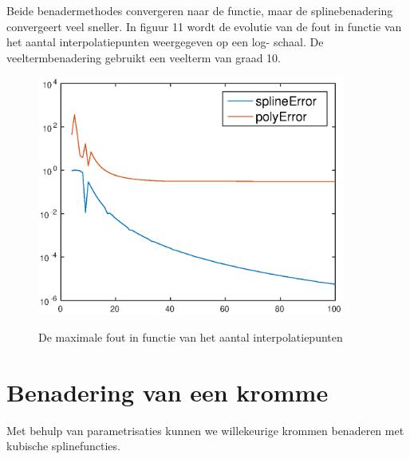 \documentclass[]{article}
\begin{document}
\noindent Beide benadermethodes convergeren naar de functie, maar de splinebenadering convergeert veel sneller. In figuur 11 wordt de evolutie van de fout in functie van het aantal interpolatiepunten weergegeven op een log- schaal.
De veeltermbenadering gebruikt een veelterm van graad 10.
\begin{figure}[H]
\begin{center}
\includegraphics[width=0.9\textwidth]{opgave3_max_error.eps}
  \label{opgave3_max_error}
  \caption{De maximale fout in functie van het aantal interpolatiepunten}
\end{center}
\end{figure}

\pagebreak
\section*{Benadering van een kromme}
Met behulp van parametrisaties kunnen we willekeurige krommen benaderen met kubische splinefuncties.
\end{document}
